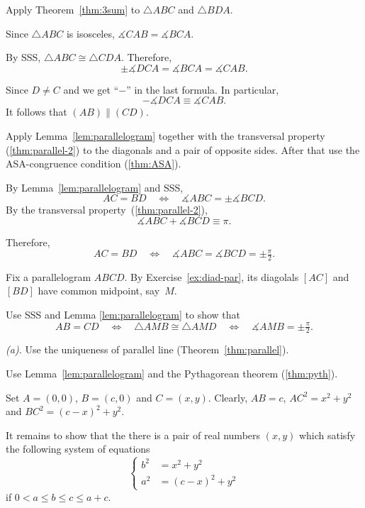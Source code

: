Apply Theorem~\ref{thm:3sum} to $\triangle ABC$ and $\triangle BDA$.

Since $\triangle ABC$ is isosceles, $\measuredangle CAB=\measuredangle BCA$.
 
By SSS, $\triangle ABC\cong \triangle CDA$.
Therefore, 
$$\pm\measuredangle DCA= \measuredangle BCA=\measuredangle CAB.$$

Since $D\ne C$ and we get ``$-$'' in the last formula.
In particular,
$$-\measuredangle DCA\equiv \measuredangle CAB.$$
It follows that $(AB)\parallel (CD)$.

Apply Lemma~\ref{lem:parallelogram} together with
the transversal property (\ref{thm:parallel-2}) to the diagonals and a pair of opposite sides.
After that use the ASA-congruence condition (\ref{thm:ASA}).

By Lemma~\ref{lem:parallelogram} and SSS, 
\[AC=BD
\quad
\iff
\quad
\measuredangle ABC=\pm \measuredangle BCD.\]
By the transversal property~(\ref{thm:parallel-2}), 
\[\measuredangle ABC+\measuredangle BCD\equiv \pi.\]

Therefore, 
\[AC=BD
\quad
\iff
\quad 
\measuredangle ABC
=\measuredangle BCD
=\pm\tfrac\pi2.\]

Fix a parallelogram $ABCD$.
By Exercise~\ref{ex:diad-par},
its diagolals $[AC]$ and $[BD]$ have common midpoint, say~$M$.

Use SSS and Lemma \ref{lem:parallelogram} to show that
\[AB=CD
\quad
\iff
\quad
\triangle AMB
\cong
\triangle AMD
\quad
\iff
\quad
\measuredangle AMB
=
\pm\tfrac\pi2.\]

 \textit{(a).} Use the uniqueness of parallel line (Theorem~\ref{thm:parallel}).

 Use Lemma~\ref{lem:parallelogram} and the Pythagorean theorem (\ref{thm:pyth}).

Set $A=(0,0)$, $B=(c,0)$ and $C=(x,y)$.
Clearly, $AB=c$,
$AC^2=x^2+y^2$ and $BC^2=(c-x)^2+y^2$.

It remains to show that the there is a pair of real numbers $(x,y)$ 
which satisfy the following system of equations 
$$
\left\{
\begin{aligned}
b^2&=x^2+y^2
\\
a^2&=(c-x)^2+y^2
\end{aligned}
\right.
$$
if $0<a\le b\le c\le a+c$.
\qeds

